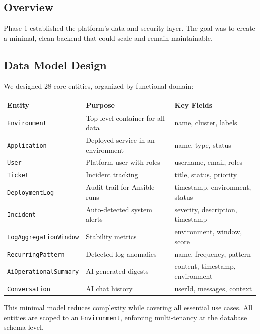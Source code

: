 \documentclass[12pt,a4paper]{report}
\begin{document}
\subsection{Overview}

Phase 1 established the platform's data and security layer. The goal was to create a minimal, clean backend that could scale and remain maintainable.

\subsection{Data Model Design}

We designed 28 core entities, organized by functional domain:

\begin{center}
\begin{tabular}{|l|l|p{4cm}|}
  \hline
  \textbf{Entity} & \textbf{Purpose} & \textbf{Key Fields} \\
  \hline
  \texttt{Environment} & Top-level container for all data & name, cluster, labels \\
  \hline
  \texttt{Application} & Deployed service in an environment & name, type, status \\
  \hline
  \texttt{User} & Platform user with roles & username, email, roles \\
  \hline
  \texttt{Ticket} & Incident tracking & title, status, priority \\
  \hline
  \texttt{DeploymentLog} & Audit trail for Ansible runs & timestamp, environment, status \\
  \hline
  \texttt{Incident} & Auto-detected system alerts & severity, description, timestamp \\
  \hline
  \texttt{LogAggregationWindow} & Stability metrics & environment, window, score \\
  \hline
  \texttt{RecurringPattern} & Detected log anomalies & name, frequency, pattern \\
  \hline
  \texttt{AiOperationalSummary} & AI-generated digests & content, timestamp, environment \\
  \hline
  \texttt{Conversation} & AI chat history & userId, messages, context \\
  \hline
\end{tabular}
\end{center}

This minimal model reduces complexity while covering all essential use cases. All entities are scoped to an \texttt{Environment}, enforcing multi-tenancy at the database schema level.
\end{document}
